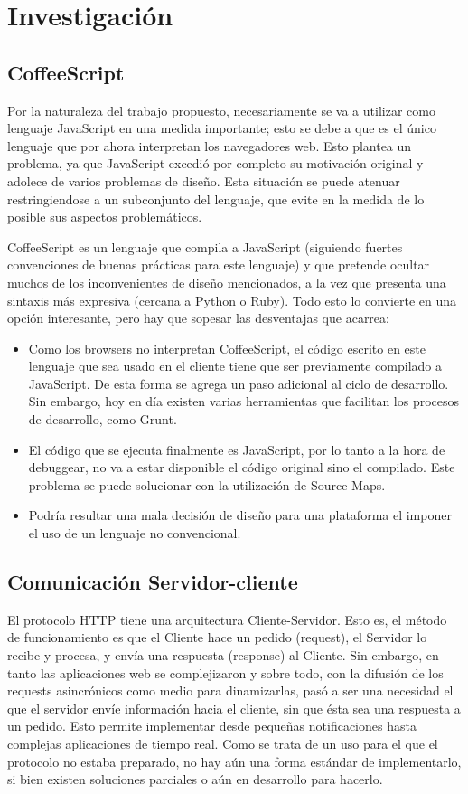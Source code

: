 \documentclass[doc,helv,longtable]{article}
\begin{document}
\section{Investigación}
\subsection{CoffeeScript}


Por la naturaleza del trabajo propuesto, necesariamente se va a utilizar como lenguaje JavaScript en una medida importante; esto se debe a que es el único lenguaje que por ahora interpretan los navegadores web. Esto plantea un problema, ya que JavaScript excedió por completo su motivación original y adolece de varios problemas de diseño\cite{goodparts}. Esta situación se puede atenuar restringiendose a un subconjunto del lenguaje, que evite en la medida de lo posible sus aspectos problemáticos.

CoffeeScript es un lenguaje que compila a JavaScript (siguiendo fuertes convenciones de buenas prácticas para este lenguaje) y que pretende ocultar muchos de los inconvenientes de diseño mencionados, a la vez que presenta una sintaxis más expresiva (cercana a Python o Ruby). Todo esto lo convierte en una opción interesante, pero hay que sopesar las desventajas que acarrea: 
\begin{itemize}
\item  Como los browsers no interpretan CoffeeScript, el código escrito en este lenguaje que sea usado en el cliente tiene que ser previamente compilado a JavaScript. De esta forma  se agrega un paso adicional al ciclo de desarrollo. Sin embargo, hoy en día existen varias herramientas que facilitan los procesos de desarrollo, como Grunt\cite{grunt}.
\item  El código que se ejecuta finalmente es JavaScript, por lo tanto a la hora de debuggear, no va a estar disponible el código original sino el compilado. Este problema se puede solucionar con la utilización de Source Maps\cite{sourcemaps}.
\item  Podría resultar una mala decisión de diseño para una plataforma el imponer el uso de un lenguaje no convencional. 

\end{itemize}

\subsection{Comunicación Servidor-cliente}
El protocolo HTTP tiene una arquitectura Cliente-Servidor. Esto es, el método de funcionamiento es que el Cliente hace un pedido (request), el Servidor lo recibe y procesa, y envía una respuesta (response) al Cliente. Sin embargo, en tanto las aplicaciones web se complejizaron y sobre todo, con la difusión de los requests asincrónicos como medio para dinamizarlas, pasó a ser una necesidad el que el servidor envíe información hacia el cliente, sin que ésta sea una respuesta a un pedido. Esto permite implementar desde pequeñas notificaciones hasta complejas aplicaciones de tiempo real. Como se trata de un uso para el que el protocolo no estaba preparado, no hay aún una forma estándar de implementarlo, si bien existen soluciones parciales o aún en desarrollo para hacerlo\cite{wsvssse}.
\end{document}
